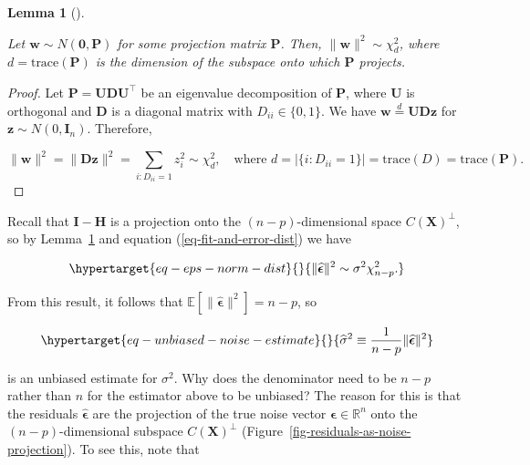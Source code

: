 \documentclass[
  11pt,
  letterpaper,
  oneside]{book}
\theoremstyle{definition}
\theoremstyle{plain}
\theoremstyle{plain}
\theoremstyle{plain}
\newtheorem{lemma}{Lemma}[chapter]
\theoremstyle{remark}
\begin{document}
\begin{lemma}[]\protect\hypertarget{lem-normal-projection}{}\label{lem-normal-projection}

Let \(\boldsymbol{w} \sim N(\boldsymbol{0}, \boldsymbol{P})\) for some
projection matrix \(\boldsymbol{P}\). Then,
\(\|\boldsymbol{w}\|^2 \sim \chi^2_d\), where
\(d = \text{trace}(\boldsymbol{P})\) is the dimension of the subspace
onto which \(\boldsymbol{P}\) projects.

\end{lemma}

\begin{proof}

Let
\(\boldsymbol{P} = \boldsymbol{U} \boldsymbol{D} \boldsymbol{U}^\top\)
be an eigenvalue decomposition of \(\boldsymbol{P}\), where
\(\boldsymbol{U}\) is orthogonal and \(\boldsymbol{D}\) is a diagonal
matrix with \(D_{ii} \in \{0,1\}\). We have
\(\boldsymbol{w} \overset{d}{=} \boldsymbol{U} \boldsymbol{D} \boldsymbol{z}\)
for \(\boldsymbol{z} \sim N(0, \boldsymbol{I}_n)\). Therefore,

\[
\|\boldsymbol{w}\|^2 = \|\boldsymbol{D} \boldsymbol{z}\|^2 = \sum_{i: D_{ii} = 1} z_i^2 \sim \chi^2_d, \quad \text{where } d = |\{i: D_{ii} = 1\}| = \text{trace}(D) = \text{trace}(\boldsymbol{P}).
\]

\end{proof}

Recall that \(\boldsymbol{I} - \boldsymbol{H}\) is a projection onto the
\((n-p)\)-dimensional space \(C(\boldsymbol{X})^\perp\), so by
Lemma~\ref{lem-normal-projection} and equation
(\ref{eq-fit-and-error-dist}) we have

\begin{equation}\protect\hypertarget{eq-eps-norm-dist}{}{
\|\boldsymbol{\widehat{\epsilon}}\|^2 \sim \sigma^2 \chi^2_{n-p}.
}\label{eq-eps-norm-dist}\end{equation}

From this result, it follows that
\(\mathbb{E}[\|\boldsymbol{\widehat{\epsilon}}\|^2] = n-p\), so

\begin{equation}\protect\hypertarget{eq-unbiased-noise-estimate}{}{
\widehat{\sigma}^2 \equiv \frac{1}{n-p}\|\boldsymbol{\widehat{\epsilon}}\|^2
}\label{eq-unbiased-noise-estimate}\end{equation}

is an unbiased estimate for \(\sigma^2\). Why does the denominator need
to be \(n-p\) rather than \(n\) for the estimator above to be unbiased?
The reason for this is that the residuals
\(\boldsymbol{\widehat{\epsilon}}\) are the projection of the true noise
vector \(\boldsymbol{\epsilon} \in \mathbb{R}^n\) onto the
\((n-p)\)-dimensional subspace \(C(\boldsymbol{X})^\perp\)
(Figure~\ref{fig-residuals-as-noise-projection}). To see this, note that
\end{document}
